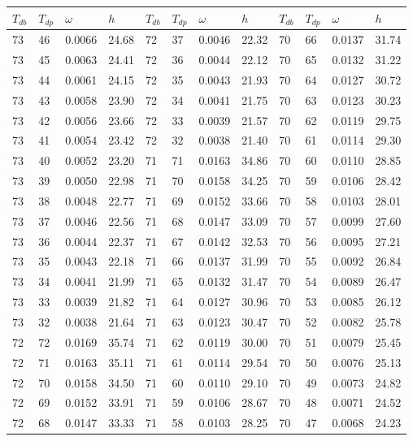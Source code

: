 \begin{tabular}{llll|llll|llll}
 \toprule 
\(T_{db}\) & \(T_{dp}\) & \(\omega\) & \(h\) & \(T_{db}\) & \(T_{dp}\) & \(\omega\) & \(h\) & \(T_{db}\) & \(T_{dp}\) & \(\omega\) & \(h\)  \\ \midrule 
73 & 46 & 0.0066 & 24.68 & 72 & 37 & 0.0046 & 22.32 & 70 & 66 & 0.0137 & 31.74\\
73 & 45 & 0.0063 & 24.41 & 72 & 36 & 0.0044 & 22.12 & 70 & 65 & 0.0132 & 31.22\\
73 & 44 & 0.0061 & 24.15 & 72 & 35 & 0.0043 & 21.93 & 70 & 64 & 0.0127 & 30.72\\
73 & 43 & 0.0058 & 23.90 & 72 & 34 & 0.0041 & 21.75 & 70 & 63 & 0.0123 & 30.23\\
73 & 42 & 0.0056 & 23.66 & 72 & 33 & 0.0039 & 21.57 & 70 & 62 & 0.0119 & 29.75\\
73 & 41 & 0.0054 & 23.42 & 72 & 32 & 0.0038 & 21.40 & 70 & 61 & 0.0114 & 29.30\\
73 & 40 & 0.0052 & 23.20 & 71 & 71 & 0.0163 & 34.86 & 70 & 60 & 0.0110 & 28.85\\
73 & 39 & 0.0050 & 22.98 & 71 & 70 & 0.0158 & 34.25 & 70 & 59 & 0.0106 & 28.42\\
73 & 38 & 0.0048 & 22.77 & 71 & 69 & 0.0152 & 33.66 & 70 & 58 & 0.0103 & 28.01\\
73 & 37 & 0.0046 & 22.56 & 71 & 68 & 0.0147 & 33.09 & 70 & 57 & 0.0099 & 27.60\\
73 & 36 & 0.0044 & 22.37 & 71 & 67 & 0.0142 & 32.53 & 70 & 56 & 0.0095 & 27.21\\
73 & 35 & 0.0043 & 22.18 & 71 & 66 & 0.0137 & 31.99 & 70 & 55 & 0.0092 & 26.84\\
73 & 34 & 0.0041 & 21.99 & 71 & 65 & 0.0132 & 31.47 & 70 & 54 & 0.0089 & 26.47\\
73 & 33 & 0.0039 & 21.82 & 71 & 64 & 0.0127 & 30.96 & 70 & 53 & 0.0085 & 26.12\\
73 & 32 & 0.0038 & 21.64 & 71 & 63 & 0.0123 & 30.47 & 70 & 52 & 0.0082 & 25.78\\
72 & 72 & 0.0169 & 35.74 & 71 & 62 & 0.0119 & 30.00 & 70 & 51 & 0.0079 & 25.45\\
72 & 71 & 0.0163 & 35.11 & 71 & 61 & 0.0114 & 29.54 & 70 & 50 & 0.0076 & 25.13\\
72 & 70 & 0.0158 & 34.50 & 71 & 60 & 0.0110 & 29.10 & 70 & 49 & 0.0073 & 24.82\\
72 & 69 & 0.0152 & 33.91 & 71 & 59 & 0.0106 & 28.67 & 70 & 48 & 0.0071 & 24.52\\
72 & 68 & 0.0147 & 33.33 & 71 & 58 & 0.0103 & 28.25 & 70 & 47 & 0.0068 & 24.23\\

\end{tabular}
